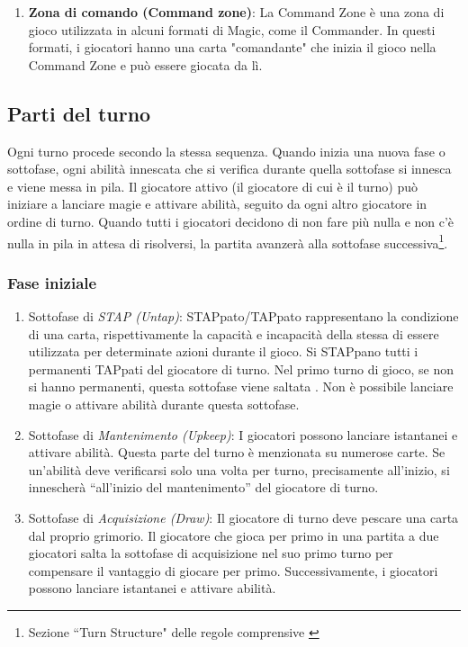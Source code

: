 \begin{enumerate}[label=\alph*.]
    \item \textbf{Zona di comando (Command zone)}: La Command Zone è una zona di gioco utilizzata in alcuni formati di Magic, come il Commander. In questi formati, i giocatori hanno una carta "comandante" che inizia il gioco nella Command Zone e può essere giocata da lì.
\end{enumerate}

\subsection{Parti del turno}\label{subsec:mtg_turns}

Ogni turno procede secondo la stessa sequenza. Quando inizia una nuova fase o sottofase, ogni abilità innescata che si verifica durante quella sottofase si innesca e viene messa in pila. Il giocatore attivo (il giocatore di cui è il turno) può iniziare a lanciare magie e attivare abilità, seguito da ogni altro giocatore in ordine di turno. Quando tutti i giocatori decidono di non fare più nulla e non c'è nulla in pila in attesa di risolversi, la partita avanzerà alla sottofase successiva\footnote{ Sezione ``Turn Structure" delle regole comprensive \cite{mtg-comp-rules}}.

\subsubsection{Fase iniziale} 
\begin{enumerate}[label=\alph*.] 
\item Sottofase di \emph{STAP (Untap)}: STAPpato/TAPpato rappresentano la condizione di una carta, rispettivamente la capacità e incapacità della stessa di essere utilizzata per determinate azioni durante il gioco. Si STAPpano tutti i permanenti TAPpati del giocatore di turno. Nel primo turno di gioco, se non si hanno permanenti, questa sottofase viene saltata%
. Non è possibile lanciare magie o attivare abilità durante questa sottofase. 
\item Sottofase di \emph{Mantenimento (Upkeep)}: I giocatori possono lanciare istantanei e attivare abilità. Questa parte del turno è menzionata su numerose carte. Se un'abilità deve verificarsi solo una volta per turno, precisamente all'inizio, si innescherà “all'inizio del mantenimento” del giocatore di turno. 
\item Sottofase di \emph{Acquisizione (Draw)}: Il giocatore di turno deve pescare una carta dal proprio grimorio. Il giocatore che gioca per primo in una partita a due giocatori salta la sottofase di acquisizione nel suo primo turno per compensare il vantaggio di giocare per primo. Successivamente, i giocatori possono lanciare istantanei e attivare abilità. 
\end{enumerate}


